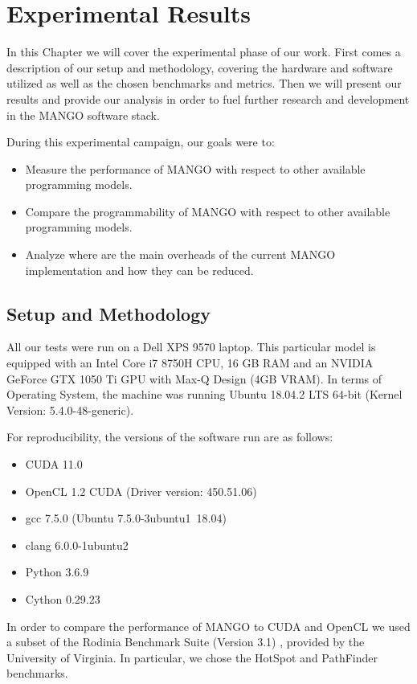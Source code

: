 \chapter{Experimental Results} \label{ch:ExperimentalResults}
In this Chapter we will cover the experimental phase of our work. First comes a description of our setup and methodology, covering the hardware and software utilized as well as the chosen benchmarks and metrics. Then we will present our results and provide our analysis in order to fuel further research and development in the MANGO software stack.

During this experimental campaign, our goals were to:
\begin{itemize}
    \item Measure the performance of MANGO with respect to other available programming models.
    \item Compare the programmability of MANGO with respect to other available programming models.
    \item Analyze where are the main overheads of the current MANGO implementation and how they can be reduced.
\end{itemize}

\section{Setup and Methodology} \label{sect:setup-methodology}
All our tests were run on a Dell XPS 9570 laptop. This particular model is equipped with an Intel Core i7 8750H CPU, 16 GB RAM and an NVIDIA GeForce GTX 1050 Ti GPU with Max-Q Design (4GB VRAM). In terms of Operating System, the machine was running Ubuntu 18.04.2 LTS 64-bit (Kernel Version: 5.4.0-48-generic).

For reproducibility, the versions of the software run are as follows:
\begin{itemize}
    \item CUDA 11.0
    \item OpenCL 1.2 CUDA (Driver version: 450.51.06)
    \item gcc 7.5.0 (Ubuntu 7.5.0-3ubuntu1~18.04)
    \item clang 6.0.0-1ubuntu2
    \item Python 3.6.9
    \item Cython 0.29.23
\end{itemize}

In order to compare the performance of MANGO to CUDA and OpenCL we used a subset of the Rodinia Benchmark Suite (Version 3.1) \cite{rodinia}, provided by the University of Virginia. In particular, we chose the HotSpot and PathFinder benchmarks.

